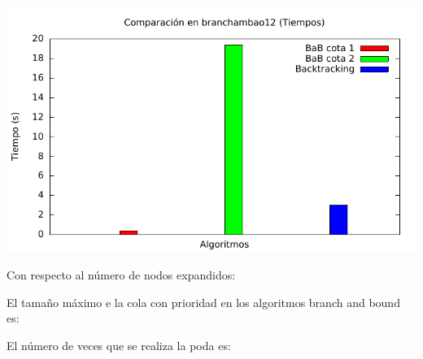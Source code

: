 \includegraphics[width=15cm]{img/barras_branchambao12_t}


Con respecto al número de nodos expandidos:

El tamaño máximo e la cola con prioridad en los algoritmos branch and bound es:

El número de veces que se realiza la poda es:
